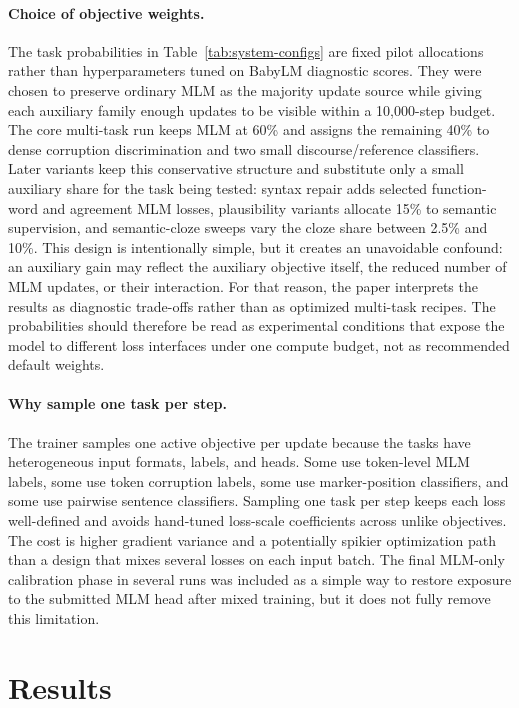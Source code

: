 \documentclass[11pt]{article}
\begin{document}
\paragraph{Choice of objective weights.}
The task probabilities in Table~\ref{tab:system-configs} are fixed pilot allocations rather than hyperparameters tuned on BabyLM diagnostic scores.
They were chosen to preserve ordinary MLM as the majority update source while giving each auxiliary family enough updates to be visible within a 10,000-step budget.
The core multi-task run keeps MLM at 60\% and assigns the remaining 40\% to dense corruption discrimination and two small discourse/reference classifiers.
Later variants keep this conservative structure and substitute only a small auxiliary share for the task being tested: syntax repair adds selected function-word and agreement MLM losses, plausibility variants allocate 15\% to semantic supervision, and semantic-cloze sweeps vary the cloze share between 2.5\% and 10\%.
This design is intentionally simple, but it creates an unavoidable confound: an auxiliary gain may reflect the auxiliary objective itself, the reduced number of MLM updates, or their interaction.
For that reason, the paper interprets the results as diagnostic trade-offs rather than as optimized multi-task recipes.
The probabilities should therefore be read as experimental conditions that expose the model to different loss interfaces under one compute budget, not as recommended default weights.

\paragraph{Why sample one task per step.}
The trainer samples one active objective per update because the tasks have heterogeneous input formats, labels, and heads.
Some use token-level MLM labels, some use token corruption labels, some use marker-position classifiers, and some use pairwise sentence classifiers.
Sampling one task per step keeps each loss well-defined and avoids hand-tuned loss-scale coefficients across unlike objectives.
The cost is higher gradient variance and a potentially spikier optimization path than a design that mixes several losses on each input batch.
The final MLM-only calibration phase in several runs was included as a simple way to restore exposure to the submitted MLM head after mixed training, but it does not fully remove this limitation.



\section{Results}
\end{document}
